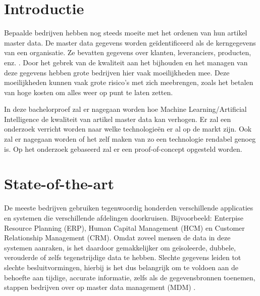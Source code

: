 
\section{Introductie}%
\label{sec:introductie}

Bepaalde bedrijven hebben nog steeds moeite met het ordenen van hun artikel master data. De master data gegevens worden geïdentificeerd als de kerngegevens van een organisatie. Ze bevatten gegevens over klanten, leveranciers, producten, enz. . Door het gebrek van de kwaliteit aan het bijhouden en het managen van deze gegevens hebben grote bedrijven hier vaak moeilijkheden mee. Deze moeilijkheden kunnen vaak grote risico’s met zich meebrengen, zoals het betalen van hoge kosten om alles weer op punt te laten zetten. 

In deze bachelorproef zal er nagegaan worden hoe Machine Learning/Artificial Intelligence de kwaliteit van artikel master data kan verhogen. Er zal een onderzoek verricht worden naar welke technologieën er al op de markt zijn. Ook zal er nagegaan worden of het zelf maken van zo een technologie rendabel genoeg is. Op het onderzoek gebaseerd zal er een proof-of-concept opgesteld worden. 


\section{State-of-the-art}%
\label{sec:state-of-the-art}


De meeste bedrijven gebruiken tegenwoordig honderden verschillende applicaties en systemen die verschillende afdelingen doorkruisen. Bijvoorbeeld: Enterpise Resource Planning (ERP), Human Capital Management (HCM) en Customer Relationship Management (CRM). Omdat zoveel mensen de data in deze systemen aanraken, is het daardoor gemakkelijker om geïsoleerde, dubbele, verouderde of zelfs tegenstrijdige data te hebben. Slechte gegevens leiden tot slechte besluitvormingen, hierbij is het dus belangrijk om te voldoen aan de behoefte aan tijdige, accurate informatie, zelfs als de gegevensbronnen toenemen, stappen bedrijven over op master data management (MDM) \autocite{SAP}.

